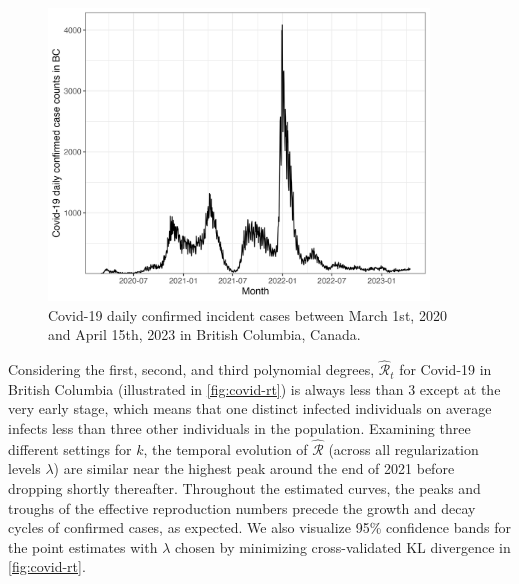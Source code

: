 \documentclass[10pt,letterpaper]{article}
\def\calR{\mathcal{R}}
\begin{document}
\begin{figure}[!ht]
  \centering
  \includegraphics[width=0.9\textwidth]{fig/covid_dat.png}
  \caption{Covid-19 daily confirmed incident cases between March 1st, 
  2020 and April 15th, 2023 in British Columbia, Canada.} 
  \label{fig:covid-data}
\end{figure} 

Considering the first, second, and third polynomial degrees, $\widehat{\calR}_t$
for Covid-19 in British Columbia (illustrated in \autoref{fig:covid-rt}) is
always less than $3$ except at the very early stage, which means that one
distinct infected individuals on average infects less than three other
individuals in the population. Examining three different settings for $k$, the
temporal evolution of $\widehat{\calR}$ (across all regularization levels
$\lambda$) are similar near the highest peak around the end of 2021 before
dropping shortly thereafter. Throughout the estimated curves, the peaks and
troughs of the effective reproduction numbers precede the growth and decay cycles of
confirmed cases, as expected. We also visualize 95\% confidence bands for the
point estimates with $\lambda$ chosen by minimizing cross-validated KL
divergence in \autoref{fig:covid-rt}.     
\end{document}

